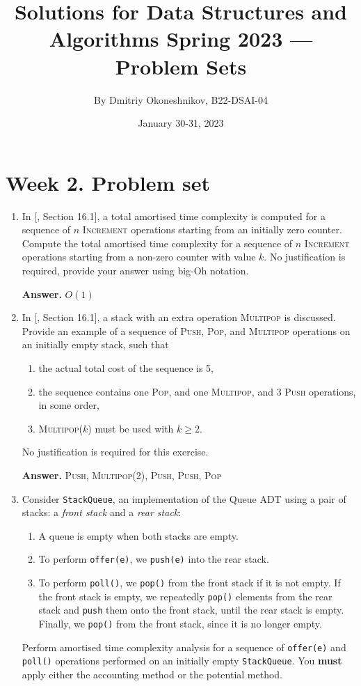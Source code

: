 \documentclass{article}
\title{Solutions for Data Structures and Algorithms Spring 2023 — Problem Sets}
\author{By Dmitriy Okoneshnikov, B22-DSAI-04}
\date{January 30-31, 2023}
\begin{document}
\maketitle

\section*{Week 2. Problem set}

\begin{enumerate}
    \item In [, Section 16.1], a total amortised time complexity is computed for a sequence of $n$ \textsc{Increment} operations starting from an initially zero counter. Compute the total amortised time complexity for a sequence of $n$ \textsc{Increment} operations starting from a non-zero counter with value $k$. No justification is required, provide your answer using big-Oh notation.

    \textbf{Answer.} $O(1)$

    \item In [, Section 16.1], a stack with an extra operation \textsc{Multipop} is discussed. Provide an example of a sequence of \textsc{Push}, \textsc{Pop}, and \textsc{Multipop} operations on an initially empty stack, such that
    \begin{enumerate}
        \item the actual total cost of the sequence is 5,
        \item the sequence contains one \textsc{Pop}, and one \textsc{Multipop}, and 3 \textsc{Push} operations, in some order,
        \item \textsc{Multipop}($k$) must be used with $k \geq 2$.
    \end{enumerate}
    No justification is required for this exercise.

    \textbf{Answer.} \textsc{Push}, \textsc{Multipop(2)}, \textsc{Push}, \textsc{Push}, \textsc{Pop}
    
    \item Consider \texttt{StackQueue}, an implementation of the Queue ADT using a pair of stacks: a \textit{front stack} and a \textit{rear stack}:
    \begin{enumerate}
        \item A queue is empty when both stacks are empty.
        \item To perform \texttt{offer(e)}, we \texttt{push(e)} into the rear stack.
        \item To perform \texttt{poll()}, we \texttt{pop()} from the front stack if it is not empty. If the front stack is empty, we repeatedly \texttt{pop()} elements from the rear stack and \texttt{push} them onto the front stack, until the rear stack is empty. Finally, we \texttt{pop()} from the front stack, since it is no longer empty.
    \end{enumerate}
    Perform amortised time complexity analysis for a sequence of \texttt{offer(e)} and \texttt{poll()} operations performed on an initially empty \texttt{StackQueue}. You \textbf{must} apply either the accounting method or the potential method.


\end{enumerate}
\end{document}
